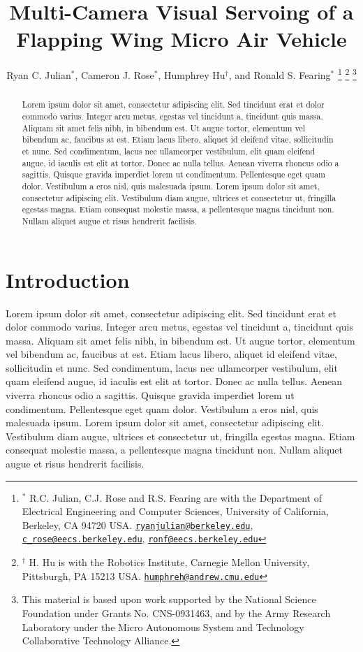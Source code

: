 \documentclass[letterpaper, 10 pt, conference]{ieeeconf}
\title{\LARGE \bf Multi-Camera Visual Servoing of a Flapping Wing Micro Air Vehicle}
\author{
    Ryan C. Julian$^{*}$,
    Cameron J. Rose$^{*}$,
    Humphrey Hu$^{\dagger}$, and
    Ronald S. Fearing$^{*}$
    \thanks{$^{*}$
    	R.C. Julian, C.J. Rose and R.S. Fearing are
        with the Department of Electrical Engineering and Computer Sciences,
        University of California, Berkeley, CA 94720 USA.
        \href{mailto:ryanjulian@berkeley.edu}{\tt ryanjulian@berkeley.edu},
        \href{mailto:c\_rose@eecs.berkeley.edu}{\tt c\_rose@eecs.berkeley.edu},
        \href{mailto:ronf@eecs.berkeley.edu}{\tt ronf@eecs.berkeley.edu}
    }
    \thanks{$^{\dagger}$
        H. Hu is with the Robotics Institute,
        Carnegie Mellon University, Pittsburgh, PA 15213 USA.
        \href{mailto:humphreh@andrew.cmu.edu.edu}{\tt humphreh@andrew.cmu.edu}
    }
    \thanks{
        This material is based upon work supported by the National Science
        Foundation under Grants No. CNS-0931463, and by the Army Research
        Laboratory under the Micro Autonomous System and Technology
        Collaborative Technology Alliance.
    }
}
\begin{document}
\maketitle
\thispagestyle{empty}
\pagestyle{empty}

\begin{abstract}
Lorem ipsum dolor sit amet, consectetur adipiscing elit. Sed tincidunt erat et dolor commodo varius. Integer arcu metus, egestas vel tincidunt a, tincidunt quis massa. Aliquam sit amet felis nibh, in bibendum est. Ut augue tortor, elementum vel bibendum ac, faucibus at est. Etiam lacus libero, aliquet id eleifend vitae, sollicitudin et nunc. Sed condimentum, lacus nec ullamcorper vestibulum, elit quam eleifend augue, id iaculis est elit at tortor. Donec ac nulla tellus. Aenean viverra rhoncus odio a sagittis. Quisque gravida imperdiet lorem ut condimentum. Pellentesque eget quam dolor. Vestibulum a eros nisl, quis malesuada ipsum. Lorem ipsum dolor sit amet, consectetur adipiscing elit. Vestibulum diam augue, ultrices et consectetur ut, fringilla egestas magna. Etiam consequat molestie massa, a pellentesque magna tincidunt non. Nullam aliquet augue et risus hendrerit facilisis.
\end{abstract}

\section{Introduction}
Lorem ipsum dolor sit amet, consectetur adipiscing elit. Sed tincidunt erat et dolor commodo varius. Integer arcu metus, egestas vel tincidunt a, tincidunt quis massa. Aliquam sit amet felis nibh, in bibendum est. Ut augue tortor, elementum vel bibendum ac, faucibus at est. Etiam lacus libero, aliquet id eleifend vitae, sollicitudin et nunc. Sed condimentum, lacus nec ullamcorper vestibulum, elit quam eleifend augue, id iaculis est elit at tortor. Donec ac nulla tellus. Aenean viverra rhoncus odio a sagittis. Quisque gravida imperdiet lorem ut condimentum. Pellentesque eget quam dolor. Vestibulum a eros nisl, quis malesuada ipsum. Lorem ipsum dolor sit amet, consectetur adipiscing elit. Vestibulum diam augue, ultrices et consectetur ut, fringilla egestas magna. Etiam consequat molestie massa, a pellentesque magna tincidunt non. Nullam aliquet augue et risus hendrerit facilisis.
\end{document}
